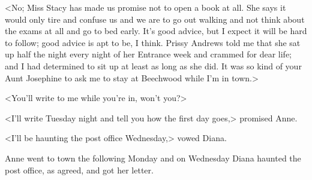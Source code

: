 <No; Miss Stacy has made us promise not to open a book at all. She says it would only tire and confuse us and we are to go out walking and not think about the exams at all and go to bed early. It's good advice, but I expect it will be hard to follow; good advice is apt to be, I think. Prissy Andrews told me that she sat up half the night every night of her Entrance week and crammed for dear life; and I had determined to sit up at least as long as she did. It was so kind of your Aunt Josephine to ask me to stay at Beechwood while I'm in town.>

<You'll write to me while you're in, won't you?>

<I'll write Tuesday night and tell you how the first day goes,> promised Anne.

<I'll be haunting the post office Wednesday,> vowed Diana.

Anne went to town the following Monday and on Wednesday Diana haunted the post office, as agreed, and got her letter.

